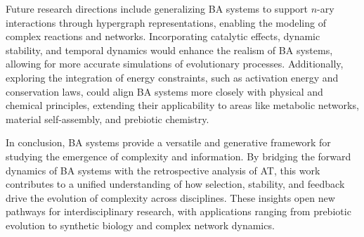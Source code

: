\documentclass[entropy,article,submit,pdftex,oneauthor]{Definitions/mdpi}
\begin{document}
Future research directions include generalizing BA systems to support \( n \)-ary interactions through hypergraph representations, enabling the modeling of complex reactions and networks. Incorporating catalytic effects, dynamic stability, and temporal dynamics would enhance the realism of BA systems, allowing for more accurate simulations of evolutionary processes. Additionally, exploring the integration of energy constraints, such as activation energy and conservation laws, could align BA systems more closely with physical and chemical principles, extending their applicability to areas like metabolic networks, material self-assembly, and prebiotic chemistry.

In conclusion, BA systems provide a versatile and generative framework for studying the emergence of complexity and information. By bridging the forward dynamics of BA systems with the retrospective analysis of AT, this work contributes to a unified understanding of how selection, stability, and feedback drive the evolution of complexity across disciplines. These insights open new pathways for interdisciplinary research, with applications ranging from prebiotic evolution to synthetic biology and complex network dynamics.
\end{document}
